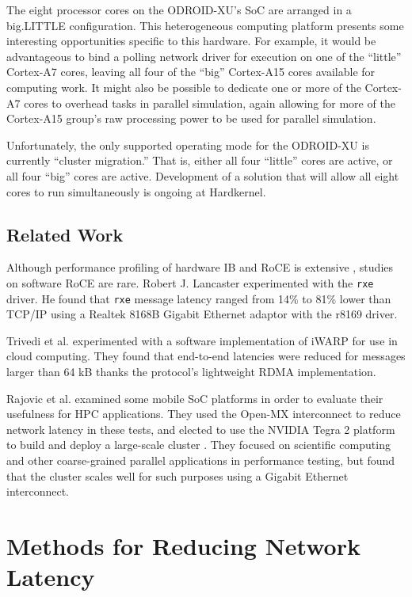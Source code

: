 \documentclass[11pt]{book}
\begin{document}
The eight processor cores on the ODROID-XU's SoC are arranged in a big.LITTLE
configuration. This heterogeneous computing platform presents some interesting
opportunities specific to this hardware. For example, it would be advantageous
to bind a polling network driver for execution on one of the ``little''
Cortex-A7 cores, leaving all four of the ``big'' Cortex-A15 cores available for
computing work. It might also be possible to dedicate one or more of the
Cortex-A7 cores to overhead tasks in parallel simulation, again allowing for
more of the Cortex-A15 group's raw processing power to be used for parallel
simulation.

Unfortunately, the only supported operating mode for the ODROID-XU is currently
``cluster migration.'' That is, either all four ``little'' cores are active, or
all four ``big'' cores are active. Development of a solution that will allow all
eight cores to run simultaneously is ongoing at Hardkernel.

\section{\textbf{Related Work}}



Although performance profiling of hardware IB and RoCE is extensive
\cite{subamaroni-09} \cite{vienne-12}, studies on software RoCE are
rare. Robert J. Lancaster \cite{lancaster-10} experimented with the \verb;rxe;
driver. He found that \verb;rxe; message latency ranged from 14\% to 81\% lower
than TCP/IP using a Realtek 8168B Gigabit Ethernet adaptor with the r8169
driver.

Trivedi et al. \cite{trivedi-11} experimented with a software implementation of
iWARP for use in cloud computing. They found that end-to-end latencies were
reduced for messages larger than 64 kB thanks the protocol's lightweight RDMA
implementation.

Rajovic et al. \cite{rajovic-13} examined some mobile SoC platforms in order to
evaluate their usefulness for HPC applications. They used the Open-MX
interconnect to reduce network latency in these tests, and elected to use the
NVIDIA Tegra 2 platform to build and deploy a large-scale cluster
\cite{rajovic-14}. They focused on scientific computing and other coarse-grained
parallel applications in performance testing, but found that the cluster scales
well for such purposes using a Gigabit Ethernet interconnect.

\newpage
\chapter{Methods for Reducing Network Latency}
\label{latency_reduction}
\end{document}
